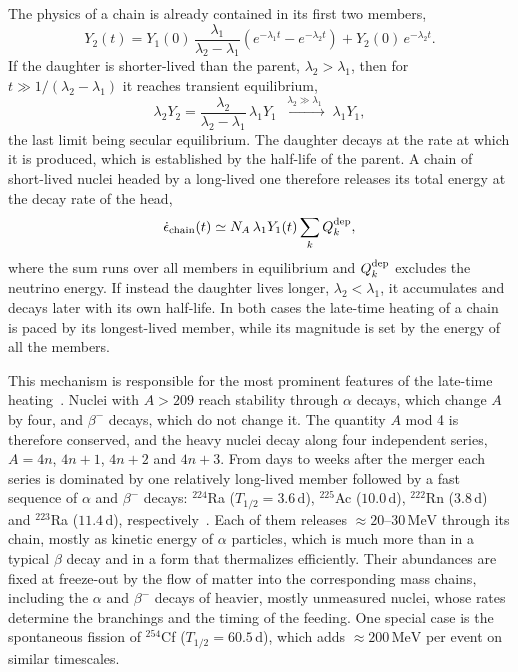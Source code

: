 The physics of a chain is already contained in its first two members,
\begin{equation}\label{eq:two_member}
  Y_2(t)=Y_1(0)\,\frac{\lambda_1}{\lambda_2-\lambda_1}\left(e^{-\lambda_1t}-e^{-\lambda_2t}\right)+Y_2(0)\,e^{-\lambda_2t}.
\end{equation}
If the daughter is shorter-lived than the parent, $\lambda_2>\lambda_1$, then for $t\gg1/(\lambda_2-\lambda_1)$ it reaches transient equilibrium,
\begin{equation}\label{eq:transient_eq}
  \lambda_2Y_2=\frac{\lambda_2}{\lambda_2-\lambda_1}\,\lambda_1Y_1\;\xrightarrow{\;\lambda_2\gg\lambda_1\;}\;\lambda_1Y_1,
\end{equation}
the last limit being secular equilibrium.
The daughter decays at the rate at which it is produced, which is established by the half-life of the parent.
A chain of short-lived nuclei headed by a long-lived one therefore releases its total energy at the decay rate of the head,
\begin{equation}\label{eq:chain_heating}
  \dot\epsilon_{\rm chain}(t)\simeq N_A\,\lambda_1Y_1(t)\sum_kQ_k^{\rm dep},
\end{equation}
where the sum runs over all members in equilibrium and $Q_k^{\rm dep}$ excludes the neutrino energy.
If instead the daughter lives longer, $\lambda_2<\lambda_1$, it accumulates and decays later with its own half-life.
In both cases the late-time heating of a chain is paced by its longest-lived member, while its magnitude is set by the energy of all the members.

This mechanism is responsible for the most prominent features of the late-time heating~\cite{wu_fingerprints_2019}.
Nuclei with $A>209$ reach stability through $\alpha$ decays, which change $A$ by four, and $\beta^-$ decays, which do not change it.
The quantity $A$ mod 4 is therefore conserved, and the heavy nuclei decay along four independent series, $A=4n$, $4n+1$, $4n+2$ and $4n+3$.
From days to weeks after the merger each series is dominated by one relatively long-lived member followed by a fast sequence of $\alpha$ and $\beta^-$ decays: ${}^{224}$Ra ($T_{1/2}=3.6\,\mathrm{d}$), ${}^{225}$Ac ($10.0\,\mathrm{d}$), ${}^{222}$Rn ($3.8\,\mathrm{d}$) and ${}^{223}$Ra ($11.4\,\mathrm{d}$), respectively~\cite{wu_fingerprints_2019,chen_radioactive_2023}.
Each of them releases $\approx20$--$30\,\mathrm{MeV}$ through its chain, mostly as kinetic energy of $\alpha$ particles, which is much more than in a typical $\beta$ decay and in a form that thermalizes efficiently.
Their abundances are fixed at freeze-out by the flow of matter into the corresponding mass chains, including the $\alpha$ and $\beta^-$ decays of heavier, mostly unmeasured nuclei, whose rates determine the branchings and the timing of the feeding.
One special case is the spontaneous fission of ${}^{254}$Cf ($T_{1/2}=60.5\,\mathrm{d}$), which adds $\approx200\,\mathrm{MeV}$ per event on similar timescales.
